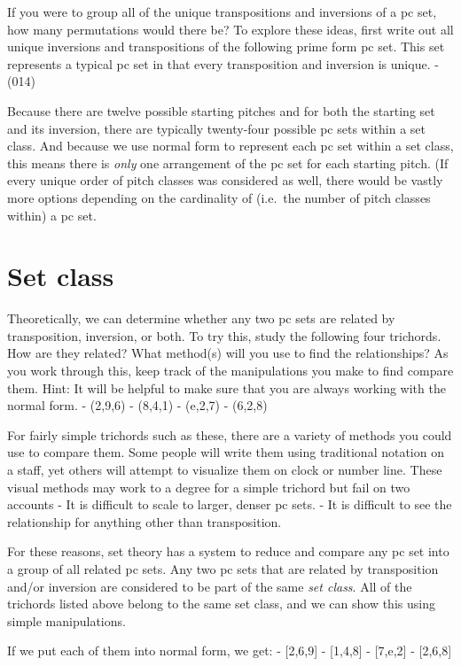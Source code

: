 \documentclass{book}
\begin{document}
If you were to group all of the unique transpositions and inversions of a pc
set, how many permutations would there be? To explore these ideas, first write
out all unique inversions and transpositions of the following prime form pc
set. This set represents a typical pc set in that every transposition and
inversion is unique. - (014)

Because there are twelve possible starting pitches and for both the starting
set and its inversion, there are typically twenty-four possible pc sets within
a set class. And because we use normal form to represent each pc set within a
set class, this means there is \emph{only} one arrangement of the pc set for
each starting pitch. (If every unique order of pitch classes was considered as
well, there would be vastly more options depending on the cardinality of
(i.e.~the number of pitch classes within) a pc set.

\hypertarget{set-class}{%
\section{Set class}\label{set-class}}

Theoretically, we can determine whether any two pc sets are related by
transposition, inversion, or both. To try this, study the following four
trichords. How are they related? What method(s) will you use to find the
relationships? As you work through this, keep track of the manipulations you
make to find compare them. Hint: It will be helpful to make sure that you are
always working with the normal form. - (2,9,6) - (8,4,1) - (e,2,7) - (6,2,8)

For fairly simple trichords such as these, there are a variety of methods you
could use to compare them. Some people will write them using traditional
notation on a staff, yet others will attempt to visualize them on clock or
number line. These visual methods may work to a degree for a simple trichord
but fail on two accounts - It is difficult to scale to larger, denser pc sets.
- It is difficult to see the relationship for anything other than
transposition.

For these reasons, set theory has a system to reduce and compare any pc set
into a group of all related pc sets. Any two pc sets that are related by
transposition and/or inversion are considered to be part of the same \emph{set
class}. All of the trichords listed above belong to the same set class, and we
can show this using simple manipulations.

If we put each of them into normal form, we get: - {[}2,6,9{]} - {[}1,4,8{]} -
{[}7,e,2{]} - {[}2,6,8{]}
\end{document}
